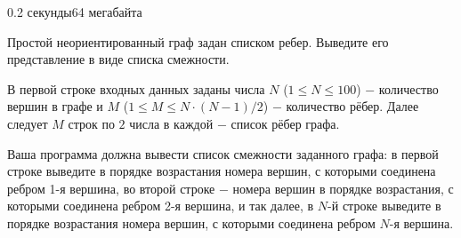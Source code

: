 \begin{problem}{}{}{}{0.2 секунды}{64 мегабайта}

Простой неориентированный граф задан списком ребер. Выведите его представление в виде списка смежности.

\InputFile
В первой строке входных данных заданы числа $N$ ($1 \le N \le 100$) $-$ количество вершин в графе и 
$M$ ($1 \le M \le N\cdot(N-1)/2$) $-$ количество рёбер.
Далее следует $M$ строк по $2$ числа в каждой $-$ список рёбер графа. 

\OutputFile
Ваша программа должна вывести список смежности заданного графа: в первой строке выведите в порядке возрастания
номера вершин, с которыми соединена ребром 1-я вершина, во второй строке $-$ номера вершин в порядке возрастания,
с которыми соединена ребром 2-я вершина, и так далее, в $N$-й строке выведите в порядке возрастания
номера вершин, с которыми соединена ребром $N$-я вершина.


\Example

\begin{example}
%
\end{example}

\end{problem}


